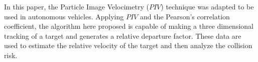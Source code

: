 In this paper, the Particle Image Velocimetry ($PIV$) technique was adapted to be used in autonomous vehicles.
Applying $PIV$ and the Pearson’s correlation coefficient, the algorithm here proposed  
is capable of making a three dimensional tracking of a target
and generates a relative departure factor. These data are used to estimate the 
relative velocity of the target and then analyze the collision risk.